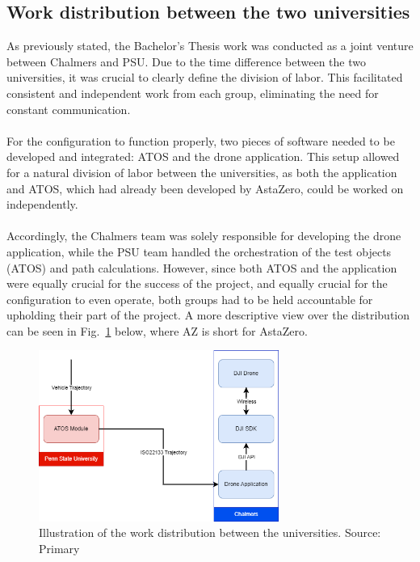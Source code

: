 
\subsection{Work distribution between the two universities}
As previously stated, the Bachelor's Thesis work was conducted as a joint venture between Chalmers and PSU. Due to the time difference between the two universities, it was crucial to clearly define the division of labor. This facilitated consistent and independent work from each group, eliminating the need for constant communication.
\\ \\
For the configuration to function properly, two pieces of software needed to be developed and integrated: ATOS and the drone application. This setup allowed for a natural division of labor between the universities, as both the application and ATOS, which had already been developed by AstaZero, could be worked on independently.
\\ \\
Accordingly, the Chalmers team was solely responsible for developing the drone application, while the PSU team handled the orchestration of the test objects (ATOS) and path calculations. However, since both ATOS and the application were equally crucial for the success of the project, and equally crucial for the configuration to even operate, both groups had to be held accountable for upholding their part of the project. A more descriptive view over the distribution can be seen in Fig.~\ref{fig:DividedBetweenUni} below, where AZ is short for AstaZero.

\begin{figure}[H]
  \centering
  \includegraphics[width=0.7\textwidth]{figure/work distribution.png}
  \caption{Illustration of the work distribution between the universities. Source: Primary}
  \label{fig:DividedBetweenUni}
\end{figure}

